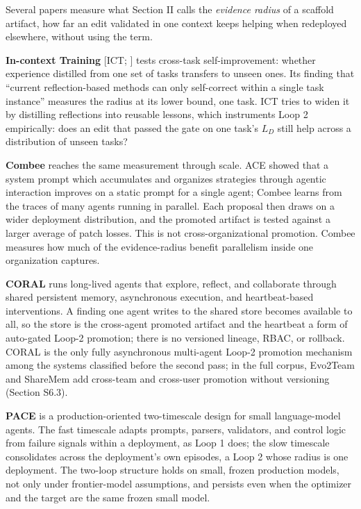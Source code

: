 \documentclass[
]{article}
\begin{document}
Several papers measure what Section II calls the \emph{evidence radius}
of a scaffold artifact, how far an edit validated in one context keeps
helping when redeployed elsewhere, without using the term.

\textbf{In-context Training} {[}ICT; \cite{shalev2026ict}{]} tests
cross-task self-improvement: whether experience distilled from one set
of tasks transfers to unseen ones. Its finding that ``current
reflection-based methods can only self-correct within a single task
instance'' measures the radius at its lower bound, one task. ICT tries
to widen it by distilling reflections into reusable lessons, which
instruments Loop 2 empirically: does an edit that passed the gate on one
task's \(L_D\) still help across a distribution of unseen tasks?

\textbf{Combee} \cite{li2026combee} reaches the same measurement
through scale. ACE \cite{ace2025agentic} showed that a system prompt
which accumulates and organizes strategies through agentic interaction
improves on a static prompt for a single agent; Combee learns from the
traces of many agents running in parallel. Each proposal then draws on a
wider deployment distribution, and the promoted artifact is tested
against a larger average of patch losses. This is not
cross-organizational promotion. Combee measures how much of the
evidence-radius benefit parallelism inside one organization captures.

\textbf{CORAL} \cite{qu2026coral} runs long-lived agents that explore,
reflect, and collaborate through shared persistent memory, asynchronous
execution, and heartbeat-based interventions. A finding one agent writes
to the shared store becomes available to all, so the store is the
cross-agent promoted artifact and the heartbeat a form of auto-gated
Loop-2 promotion; there is no versioned lineage, RBAC, or rollback.
CORAL is the only fully asynchronous multi-agent Loop-2 promotion
mechanism among the systems classified before the second pass; in the
full corpus, Evo2Team and ShareMem add cross-team and cross-user
promotion without versioning (Section S6.3).

\textbf{PACE} \cite{ling2026pace} is a production-oriented
two-timescale design for small language-model agents. The fast timescale
adapts prompts, parsers, validators, and control logic from failure
signals within a deployment, as Loop 1 does; the slow timescale
consolidates across the deployment's own episodes, a Loop 2 whose radius
is one deployment. The two-loop structure holds on small, frozen
production models, not only under frontier-model assumptions, and
persists even when the optimizer and the target are the same frozen
small model.
\end{document}
